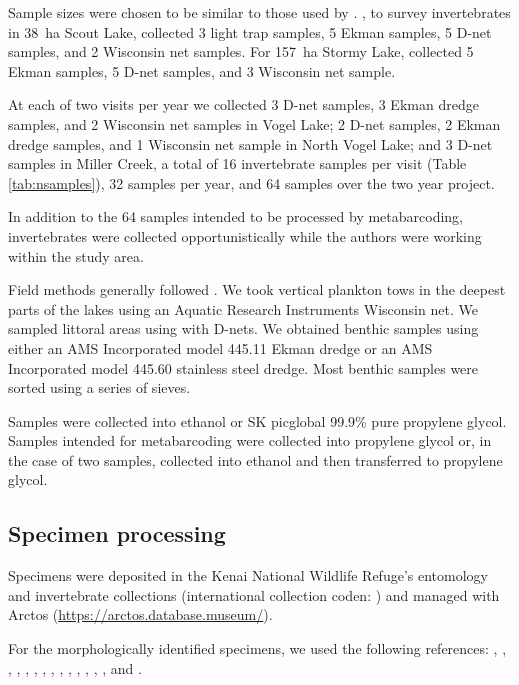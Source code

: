 \begin{multicols}{2}
Sample sizes were chosen to be similar to those used by \citet{Massengill2014, Massengill2017}. \citet{Massengill2014}, to survey invertebrates in 38~ha Scout Lake, collected 3 light trap samples, 5 Ekman samples, 5 D-net samples, and 2 Wisconsin net samples. For 157~ha Stormy Lake, \citet{Massengill2014, Massengill2017} collected 5 Ekman samples, 5 D-net samples, and 3 Wisconsin net sample.



At each of two visits per year we collected 3 D-net samples, 3 Ekman dredge samples, and 2 Wisconsin net samples in Vogel Lake; 2 D-net samples, 2 Ekman dredge samples, and 1 Wisconsin net sample in North Vogel Lake; and 3 D-net samples in Miller Creek, a total of 16 invertebrate samples per visit (Table \ref{tab:nsamples}), 32 samples per year, and 64 samples over the two year project.

In addition to the 64 samples intended to be processed by metabarcoding, invertebrates were collected opportunistically while the authors were working within the study area.

Field methods generally followed \citet{Massengill2014, Massengill2017}. We took vertical plankton tows in the deepest parts of the lakes using an Aquatic Research Instruments Wisconsin net. We sampled littoral areas using with D-nets. We obtained benthic samples using either an AMS Incorporated model 445.11 Ekman dredge or an AMS Incorporated model 445.60  stainless steel dredge. Most benthic samples were sorted using a series of sieves.

Samples were collected into ethanol or SK picglobal 99.9\% pure propylene glycol. Samples intended for metabarcoding were collected into propylene glycol or, in the case of two samples, collected into ethanol and then transferred to propylene glycol.

\subsection{Specimen processing}

Specimens were deposited in the Kenai National Wildlife Refuge's entomology and invertebrate collections (international collection coden: ) and managed with Arctos (\url{https://arctos.database.museum/}).

For the morphologically identified specimens, we used the following references: \cite{Borroretal1989}, \cite{Brooks1957}, \cite{Collet2008}, \cite{Durfee2005}, \cite{Haneyetal2013}, \cite{Hatch1953}, \cite{Kenner2009}, \cite{Marx1957}, \cite{MerrittCummins1996}, \cite{Merrittetal2008}, \cite{Reid1987}, \cite{Rileyetal2002}, \cite{Roughley2000}, \cite{Wallis1933}, and \cite{White1983}.



\end{multicols}
